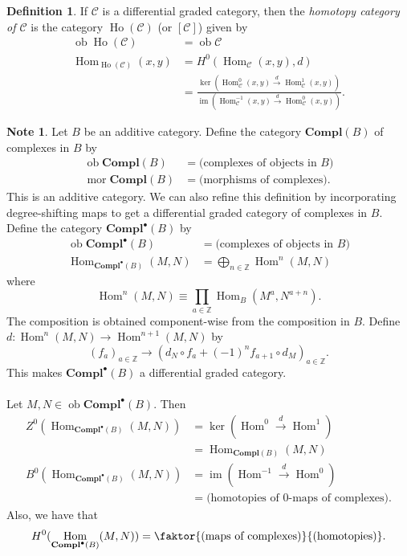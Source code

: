 \documentclass[10pt,letterpaper,cm]{nupset}
\theoremstyle{definition}
\newtheorem*{definition}{Definition}
\newtheorem{note}{Note}
\newcommand{\Z}{\mathbb Z}
\newcommand{\1}{\mathbf{1}}
\renewcommand{\c}{\mathscr{C}}
\newcommand{\0}{\vec 0}
\DeclareMathOperator{\im}{im}
\DeclareMathOperator{\mor}{mor}
\DeclareMathOperator{\ob}{ob}
\DeclareMathOperator{\Hom}{Hom}
\DeclareMathOperator{\ho}{Ho}
\begin{document}
\begin{definition}
If $\c$ is a differential graded category, then the \textit{homotopy category of $\c$} is the category $\ho(\c)$ (or $[\c]$) given by 
\begin{align*}
\ob{\ho(\c)} & = \ob{\c}
\\  \Hom_{\ho(\c)}(x,y) & = H^0(\Hom_{\c}(x,y), d)
\\ & =\frac{   \ker(\Hom^0_{\c}(x,y) \overset{d}{\longrightarrow} \Hom_{\c}^1(x,y))  }{  \im(\Hom_{\c}^{-1}(x,y) \overset{d}{\longrightarrow} \Hom_{\c}^0(x,y))      }.
\end{align*}
\end{definition}

\begin{note} Let $B$ be an additive category. Define the category  $\mathbf{Compl}(B)$  of complexes in $B$ by 
\begin{align*}
\ob{\mathbf{Compl}(B)} & = \text{(complexes of objects in } B\text{)}
\\ \mor{\mathbf{Compl}(B)} & = \text{(morphisms of complexes)}.
\end{align*}
This is an additive category. We can also refine this definition by incorporating degree-shifting maps to get a differential graded category of complexes in $B$. Define the category $\mathbf{Compl}^{\bullet}(B)$ by 
\begin{align*}
\ob{\mathbf{Compl}^{\bullet}(B)} & = \text{(complexes of objects in } B\text{)}
\\ \Hom_{\mathbf{Compl}^{\bullet}(B)}(M, N) & = \bigoplus_{n \in \Z}\Hom^n(M, N)
\end{align*}
where $$ \Hom^n(M , N) \equiv \prod_{a\in \Z} \Hom_B(M^a, N^{a+n})  .$$  The composition is obtained component-wise from the composition in $B$. Define $d : \Hom^n(M, N) \to \Hom^{n+1}(M, N)$ by $$ (f_a)_{a\in \Z} \to (d_N \circ f_a + ({-}1)^n f_{a+1} \circ d_M)_{a\in \Z}  .$$ This makes $\mathbf{Compl}^{\bullet}(B)$ a differential graded category. 
\\ \\
Let $M , N \in \ob{\mathbf{Compl}^{\bullet}(B)}$. Then 
\begin{align*}
Z^0(\Hom_{\mathbf{Compl}^{\bullet}(B)}(M, N)) & =\ker(\Hom^0 \overset{d}{\longrightarrow} \Hom^1) 
\\
 & = \Hom_{\mathbf{Compl}(B)}(M, N) 
 \\ B^0(\Hom_{\mathbf{Compl}^{\bullet}(B)}(M, N)) & = \im(\Hom^{-1} \overset{d}{\longrightarrow} \Hom^0) 
 \\ & = \text{(homotopies of }0\text{-maps of complexes)}.
 \end{align*} Also, we have that $$H^0(\Hom_{\mathbf{Compl}^{\bullet}(B)}(M, N))=  \faktor{\text{(maps of complexes)}}{\text{(homotopies)}}.$$
 \end{note}
\end{document}

